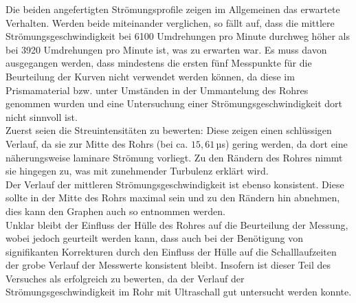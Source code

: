 Die beiden angefertigten Strömungsprofile zeigen im Allgemeinen das erwartete Verhalten.
Werden beide miteinander verglichen, so fällt auf, dass die mittlere Strömungsgeschwindigkeit
bei 6100 Umdrehungen pro Minute durchweg höher als bei 3920 Umdrehungen pro Minute ist, was
zu erwarten war. Es muss davon ausgegangen werden, dass mindestens die ersten fünf Messpunkte
für die Beurteilung der Kurven nicht verwendet werden können, da diese im Prismamaterial
bzw. unter Umständen in der Ummantelung des Rohres genommen wurden und eine Untersuchung
einer Strömungsgeschwindigkeit dort nicht sinnvoll ist.\\
Zuerst seien die Streuintensitäten zu bewerten: Diese zeigen einen schlüssigen Verlauf,
da sie zur Mitte des Rohrs (bei ca. $15{,}61$\,µs) gering werden, da dort eine näherungsweise
laminare Strömung vorliegt. Zu den Rändern des Rohres nimmt sie hingegen zu, was mit zunehmender
Turbulenz erklärt wird.\\
Der Verlauf der mittleren Strömungsgeschwindigkeit ist ebenso konsistent. Diese
sollte in der Mitte des Rohrs maximal sein und zu den Rändern hin abnehmen, dies kann den Graphen
auch so entnommen werden.\\
Unklar bleibt der Einfluss der Hülle des Rohres auf die Beurteilung der Messung, wobei
jedoch geurteilt werden kann, dass auch bei der Benötigung von signifikanten Korrekturen
durch den Einfluss der Hülle auf die Schalllaufzeiten der grobe Verlauf der Messwerte
konsistent bleibt. Insofern ist dieser Teil des Versuches als erfolgreich zu bewerten, da
der Verlauf der Strömungsgeschwindigkeit im Rohr mit Ultraschall gut untersucht werden konnte.
